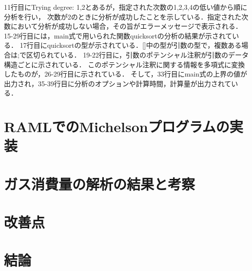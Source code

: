 \documentclass{kuisthesis}
\begin{document}
11行目にTrying degree: 1,2とあるが，指定された次数の1,2,3,4の低い値から順に分析を行い，
次数が2のときに分析が成功したことを示している．指定された次数において分析が成功しない場合，その旨がエラーメッセージで表示される．
15-29行目には，main式で用いられた関数quicksortの分析の結果が示されている．
17行目にquicksortの型が示されている．[]中の型が引数の型で，複数ある場合は;で区切られている．
19-22行目に，引数のポテンシャル注釈が引数のデータ構造ごとに示されている．
このポテンシャル注釈に関する情報を多項式に変換したものが，26-29行目に示されている．
そして，33行目にmain式の上界の値が出力され，35-39行目に分析のオプションや計算時間，計算量が出力されている．


\section{RAMLでのMichelsonプログラムの実装}

\section{ガス消費量の解析の結果と考察}

\section{改善点}

\section{結論}\label{sec-conclusion}

\acknowledgments

\nocite{*}


\end{document}
